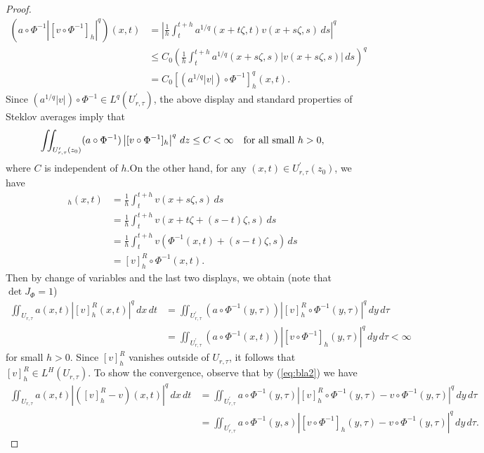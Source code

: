 \documentclass[notitlepage,11pt,reqno]{amsart}
\theoremstyle{definition}
\numberwithin{equation}{section}
\begin{document}
\begin{proof}
\begin{align} \label{eq:bla3}
\left(a\circ\Phi^{-1}\left|[v\circ\Phi^{-1}]_{h}\right|^{q}\right)(x,t) & =\left|\frac{1}{h}\int_{t}^{t+h}a^{1/q}(x+t\zeta,t)v(x+s\zeta,s)\, ds\right|^{q}\nonumber\\ 
 & \leq C_{0}\left(\frac{1}{h}\int_{t}^{t+h}a^{1/q}(x+s\zeta,s)\left|v(x+s\zeta,s)\right|\, ds\right)^{q} \nonumber \\ 
 & =C_{0}[(a^{1/q}\left|v\right|)\circ\Phi^{-1}]_{h}^{q}(x,t).
\end{align}
Since $(a^{1/q}\left|v\right|)\circ\Phi^{-1}\in L^{q}(U_{r, \tau}^{\prime})$,
the above display and standard properties of Steklov averages imply
that
\[
\iint_{U^{\prime}_{r, \tau}(z_0)}(a\circ\Phi^{-1})\left|[v\circ\Phi^{-1}]_{h}\right|^{q}\, dz\leq C<\infty \quad\text{for all small \ensuremath{h>0,}}
\]
where $C$ is independent of $h$.On the other hand, for any $(x,t)\in U^{\prime}_{r, \tau} (z_0)$, we have
\begin{align}
[v\circ\Phi^{-1}]_{h}(x,t) & =\frac{1}{h}\int_{t}^{t+h}v(x+s\zeta,s)\,ds\nonumber \\
 & =\frac{1}{h}\int_{t}^{t+h}v(x+t\zeta+(s-t)\zeta,s)\, ds\nonumber \\
 & =\frac{1}{h}\int_{t}^{t+h}v(\Phi^{-1}(x,t)+(s-t)\zeta,s)\,ds\nonumber \\
 & =[v]_{h}^{R}\circ\Phi^{-1}(x,t).\label{eq:bla2}
\end{align}
Then by change of variables and the last two displays, we obtain (note that $\det J_{\Phi}=1$)
\begin{align*}
\iint_{U_{r, \tau}}a(x, t)\left|[v]_{h}^{R}(x, t)\right|^{q}\,dx\, dt & =\iint_{U_{r, \tau}^{\prime}}(a\circ\Phi^{-1}(y, \tau))\left|[v]_{h}^{R}\circ\Phi^{-1}(y, \tau)\right|^{q}\,dy\, d\tau\\
 & =\iint_{U_{r, \tau}^{\prime}}(a\circ\Phi^{-1}(x, t))\left|[v\circ\Phi^{-1}]_{h}(y, \tau)\right|^{q}\,dy\,d\tau<\infty
\end{align*}
for small $h>0$. Since $[v]_{h}^{R}$ vanishes outside of $U_{r, \tau}$,
it follows that $[v]_{h}^{R}\in L^{H}(U_{r, \tau})$. To show the convergence, observe that by (\ref{eq:bla2}) we have
\begin{align}
\iint_{U_{r, \tau}}a(x , t)\left|([v]_{h}^{R}-v)(x, t)\right|^{q}\,dx\, dt & =\iint_{U^{\prime}_{r, \tau}}a\circ\Phi^{-1}(y, \tau)\left|[v]_{h}^{R}\circ\Phi^{-1}(y, \tau)-v\circ\Phi^{-1}(y, \tau)\right|^{q}\,dy\, d\tau\nonumber \\
 & =\iint_{U^{\prime}_{r, \tau}}a\circ\Phi^{-1}(y,s)\left|[v\circ\Phi^{-1}]_{h}(y, \tau)-v\circ\Phi^{-1}(y, \tau)\right|^{q}\,dy\,d\tau.\label{eq:convegence}

\end{align}
\end{proof}
\end{document}
